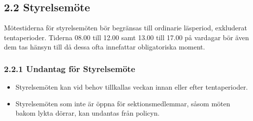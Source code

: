 \documentclass[]{dsekkallelse}
\begin{document}
\subsection{2.2 Styrelsemöte}
Mötestiderna för styrelsemöten bör begränsas till ordinarie läsperiod, exkluderat tentaperioder. Tiderna 08.00 till 12.00 samt 13.00 till 17.00 på vardagar bör även dem tas hänsyn till då dessa ofta innefattar obligatoriska moment.

\subsubsection{2.2.1 Undantag för Styrelsemöte}
\begin{itemize}
    \item Styrelsemöten kan vid behov tillkallas veckan innan eller efter tentaperioder.
    \item Styrelsemöten som inte är öppna för sektionsmedlemmar, såsom möten bakom lykta dörrar, kan undantas från policyn.
\end{itemize}
\end{document}
